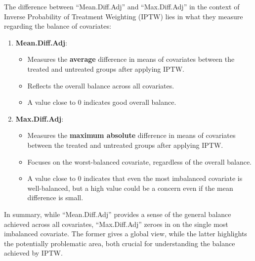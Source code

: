 \documentclass[
  singlecolumn]{article}
\providecommand{\tightlist}{%
  \setlength{\itemsep}{0pt}\setlength{\parskip}{0pt}}\usepackage{longtable,booktabs,array}
\begin{document}
The difference between ``Mean.Diff.Adj'' and ``Max.Diff.Adj'' in the
context of Inverse Probability of Treatment Weighting (IPTW) lies in
what they measure regarding the balance of covariates:

\begin{enumerate}
\def\labelenumi{\arabic{enumi}.}
\tightlist
\item
  \textbf{Mean.Diff.Adj}:

  \begin{itemize}
  \tightlist
  \item
    Measures the \textbf{average} difference in means of covariates
    between the treated and untreated groups after applying IPTW.
  \item
    Reflects the overall balance across all covariates.
  \item
    A value close to 0 indicates good overall balance.
  \end{itemize}
\item
  \textbf{Max.Diff.Adj}:

  \begin{itemize}
  \tightlist
  \item
    Measures the \textbf{maximum absolute} difference in means of
    covariates between the treated and untreated groups after applying
    IPTW.
  \item
    Focuses on the worst-balanced covariate, regardless of the overall
    balance.
  \item
    A value close to 0 indicates that even the most imbalanced covariate
    is well-balanced, but a high value could be a concern even if the
    mean difference is small.
  \end{itemize}
\end{enumerate}

In summary, while ``Mean.Diff.Adj'' provides a sense of the general
balance achieved across all covariates, ``Max.Diff.Adj'' zeroes in on
the single most imbalanced covariate. The former gives a global view,
while the latter highlights the potentially problematic area, both
crucial for understanding the balance achieved by IPTW.
\end{document}
